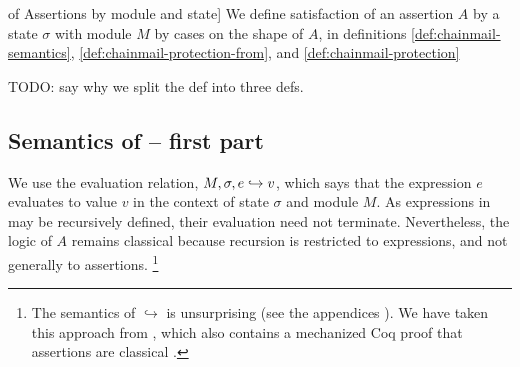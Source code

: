 \begin{definition} 
\label{def:chainmail-semantics-all}
of Assertions by module and  state] 
\label{def:chainmail-semantics}
We define satisfaction of an assertion $A$ by a %
state $\sigma$ with 
 module $M$ by cases on the shape of $A$, in definitions \ref{def:chainmail-semantics}, \ref{def:chainmail-protection-from}, and 
 \ref{def:chainmail-protection}
\end{definition}

TODO: say why we split the def into three defs. 

\subsection{Semantics of \AssertLang -- first part}

We   use the evaluation relation, $M, \sigma, e \hookrightarrow v$,
which says that the expression $e$ evaluates
to value $v$ in the context of state $\sigma$ and module $M$.
As expressions in \LangOO may be recursively defined, their evaluation 
need not   %
 terminate. Nevertheless, the logic of $A$ remains classical because recursion is restricted
to expressions, and not generally to assertions.
\footnote{
The semantics of $\hookrightarrow$ {is} unsurprising 
(see {the appendices %
\cite{necessityFull}).}
We have taken this approach from , which also contains a mechanized Coq proof that assertions are classical \cite{coqFASE}. } %


